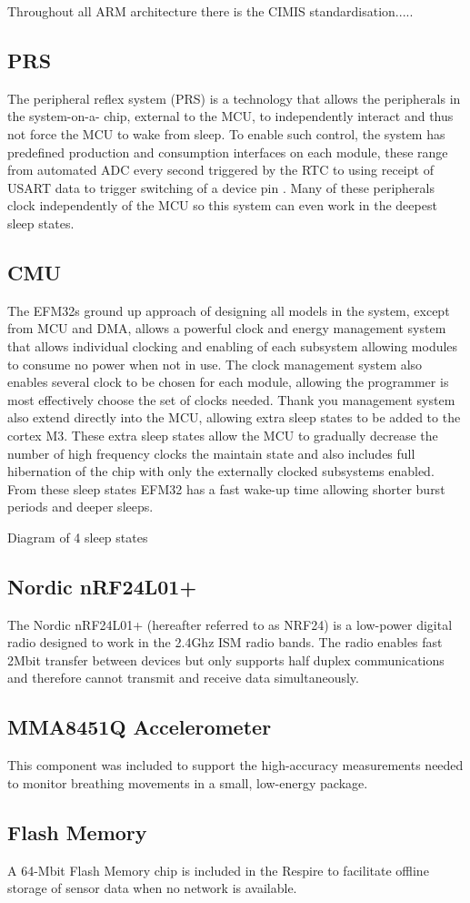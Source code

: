 Throughout all ARM architecture there is the CIMIS standardisation.....

\cite{Sadasivan 2006} \cite{Arm2012, EnergyMicro2011}


\subsection{PRS}
The peripheral reflex system (PRS) is a technology that allows the peripherals in the system-on-a-
chip, external to the MCU, to independently interact and thus not force the MCU to wake from
sleep. To enable such control, the system has predefined production and consumption interfaces on
each module, these range from automated ADC every second triggered by the RTC to using receipt
of USART data to trigger switching of a device pin . Many of these peripherals clock independently of
the MCU so this system can even work in the deepest sleep states.

\subsection{CMU}
The EFM32s ground up approach of designing all models in the system, except from MCU and DMA,
allows a powerful clock and energy management system that allows individual clocking and enabling
of each subsystem allowing modules to consume no power when not in use. The clock management
system also enables several clock to be chosen for each module, allowing the programmer is most
effectively choose the set of clocks needed. Thank you management system also extend directly into
the MCU, allowing extra sleep states to be added to the cortex M3. These extra sleep states allow
the MCU to gradually decrease the number of high frequency clocks the maintain state and
also includes full hibernation of the chip with only the externally clocked subsystems
enabled. From these sleep states EFM32 has a fast wake-up time allowing shorter burst
periods and deeper sleeps.

{Diagram of 4 sleep states}

\subsection{Nordic nRF24L01+}
The Nordic nRF24L01+ (hereafter referred to as NRF24) is a low-power digital radio
designed to work in the 2.4Ghz ISM radio bands. The radio enables fast 2Mbit transfer
between devices but only supports half duplex communications and therefore cannot transmit and
receive data simultaneously.

\subsection{MMA8451Q Accelerometer}
This component was included to support the high-accuracy measurements needed to monitor
breathing movements in a small, low-energy package.

\subsection{Flash Memory}
A 64-Mbit Flash Memory chip is included in the Respire to facilitate offline storage of sensor data
when no network is available.


